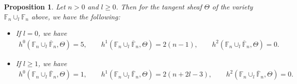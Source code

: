 \documentclass[pdftex]{sigma}
\numberwithin{equation}{section}
\newtheorem{Proposition}[Theorem]{Proposition}
{\theoremstyle{definition}
\newtheorem{Definition}[Theorem]{Definition}
\newtheorem{Remark}[Theorem]{Remark}
}
\begin{document}
\begin{Proposition}\label{prop:fd2}
Let $n>0$ and $l\ge 0$.
Then for the tangent sheaf $\Theta$ of the variety $\mathbb{F}_n \cup_l \mathbb{F}_n$ above, we have the following:
\begin{itemize}\itemsep=0pt
\item[$(i)$] If $l=0$, we have
\begin{gather*}
h^0(\mathbb{F}_n \cup_l \overline{\mathbb{F}}_n,\Theta) = 5,
\qquad
h^1(\mathbb{F}_n \cup_l \overline{\mathbb{F}}_n,\Theta) = 2(n-1),
\qquad
h^2(\mathbb{F}_n \cup_l \overline{\mathbb{F}}_n,\Theta) = 0.
\end{gather*}
\item[$(ii)$] If $l\ge 1$, we have
\begin{gather*}
h^0(\mathbb{F}_n \cup_l \overline{\mathbb{F}}_n,\Theta) = 1,
\qquad
h^1(\mathbb{F}_n \cup_l \overline{\mathbb{F}}_n,\Theta) = 2(n+2l-3),
\qquad
h^2(\mathbb{F}_n \cup_l \overline{\mathbb{F}}_n,\Theta) = 0.
\end{gather*}
\end{itemize}
\end{Proposition}
\end{document}
